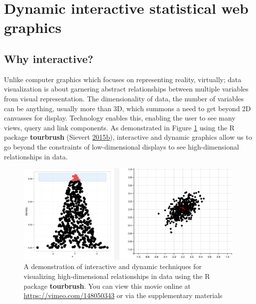 \documentclass[12pt,]{isuthesis}
\begin{document}
\hypertarget{dynamic-interactive-statistical-web-graphics}{\section{Dynamic
interactive statistical web
graphics}\label{dynamic-interactive-statistical-web-graphics}}

\subsection{Why interactive?}\label{why-interactive}

Unlike computer graphics which focuses on representing reality,
virtually; data visualization is about garnering abstract relationships
between multiple variables from visual representation. The
dimensionality of data, the number of variables can be anything, usually
more than 3D, which summons a need to get beyond 2D canvasses for
display. Technology enables this, enabling the user to see many views,
query and link components. As demonstrated in Figure \ref{fig:touR}
using the R package \textbf{tourbrush} (Sievert
\protect\hyperlink{ref-tourbrush}{2015}\protect\hyperlink{ref-tourbrush}{b}),
interactive and dynamic graphics allow us to go beyond the constraints
of low-dimensional displays to see high-dimensional relationships in
data.

\begin{figure}[htbp]
\centering
\includegraphics{images/tourbrush}
\caption{\label{fig:touR}A demonstration of interactive and dynamic
techniques for visualizing high-dimensional relationships in data using
the R package \textbf{tourbrush}. You can view this movie online at
\url{https://vimeo.com/148050343} or via the supplementary materials}
\end{figure}
\end{document}
